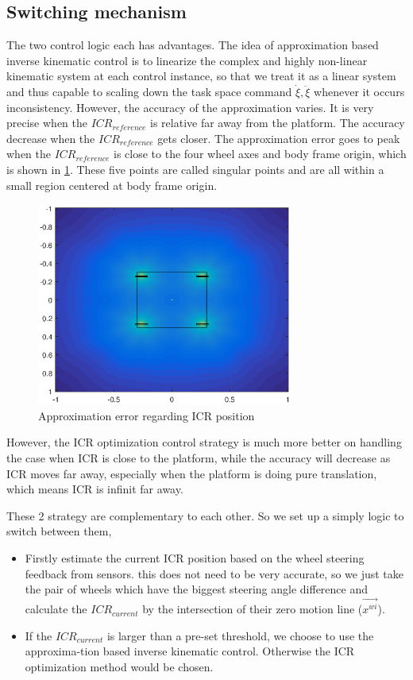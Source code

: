 \subsection{Switching mechanism}
\label{subsec:switching}
The two control logic each has advantages. 
The idea of approximation based inverse kinematic control is to linearize the complex and highly non-linear kinematic system at each control instance, so that we treat it as a linear system and thus capable to scaling down the task space command $\dot{\xi}, \ddot{\xi}$ whenever it occurs inconsistency. However, the accuracy of the approximation varies. It is very precise when the $ICR_{reference}$ is relative far away from the platform. The accuracy decrease when the  $ICR_{reference}$ gets closer. The approximation error goes to peak when the $ICR_{reference}$ is close to the four wheel axes and body frame origin, which is shown in \cref{fig:approximationError}. These five points are called singular points and are all within a small region centered at body frame origin. 
\begin{figure}[!ht]
    \centering
    \includegraphics[width=0.75\textwidth]{Figures/approximationError.eps}
    \caption{Approximation error regarding ICR position}
    \label{fig:approximationError}
\end{figure}
However, the ICR optimization control strategy is much more better on handling the case when ICR is close to the platform, while the accuracy will decrease as ICR moves far away, especially when the platform is doing pure translation, which means ICR is infinit far away.

These 2 strategy are complementary to each other. So we set up a simply logic to switch between them, 
\begin{itemize}
    \item[1.] Firstly estimate the current ICR position based on the wheel steering feedback from sensors. this does not need to be very accurate, so we just take the pair of wheels which have the biggest steering angle difference and calculate the $ICR_{current}$ by the intersection of their zero motion line ($\overrightarrow{x^{wi}}$).
    \item[2.] If the $ICR_{current}$ is larger than a pre-set threshold, we choose to use the approxima-tion based inverse kinematic control. Otherwise the ICR optimization method would be chosen.
\end{itemize}